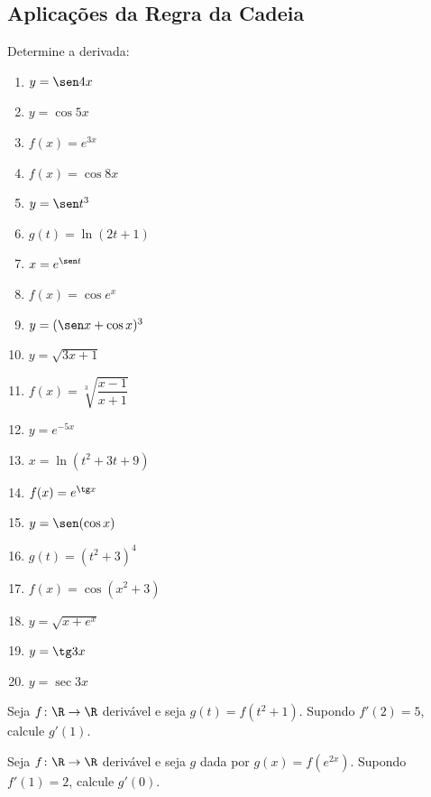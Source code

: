 \subsection{Aplicações da Regra da Cadeia}

\begin{exercicio}[1]
Determine a derivada:
\begin{enumerate}[label=\alph*)]
    \item $y = \sen 4x$
    \item $y = \cos 5x$
    \item $f(x) = e^{3x}$
    \item $f(x) = \cos 8x$
    \item $y = \sen t^3$
    \item $g(t) = \ln(2t + 1)$
    \item $x = e^{\sen t}$
    \item $f(x) = \cos e^x$
    \item $y = (\sen x + \cos x)^3$
    \item $y = \sqrt{3x + 1}$
    \item $f(x) = \sqrt[3]{\dfrac{x - 1}{x + 1}}$
    \item $y = e^{-5x}$
    \item $x = \ln(t^2 + 3t + 9)$
    \item $f(x) = e^{\tg x}$
    \item $y = \sen(\cos x)$
    \item $g(t) = (t^2 + 3)^4$
    \item $f(x) = \cos(x^2 + 3)$
    \item $y = \sqrt{x + e^x}$
    \item $y = \tg 3x$
    \item $y = \sec 3x$
\end{enumerate}
\end{exercicio}

\begin{exercicio}[2]
Seja $f\colon \R \to \R$ derivável e seja $g(t) = f(t^2 + 1)$. Supondo $f'(2) = 5$, calcule $g'(1)$.
\end{exercicio}

\begin{exercicio}[3]
Seja $f\colon \R \to \R$ derivável e seja $g$ dada por $g(x) = f(e^{2x})$. Supondo $f'(1) = 2$, calcule $g'(0)$.
\end{exercicio}

